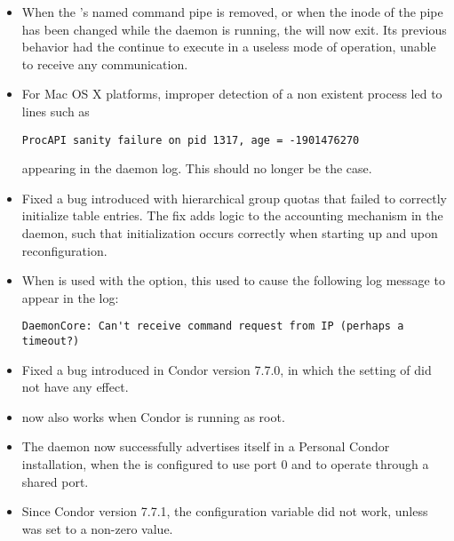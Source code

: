 \begin{itemize}

\item When the 's named command pipe is removed, 
or when the inode of the pipe has been changed while the daemon is running, 
the  will now exit.
Its previous behavior had the  continue to execute 
in a useless mode of operation, unable to receive any communication.

\item For Mac OS X platforms, 
improper detection of a non existent process led to lines such as
\begin{verbatim}
ProcAPI sanity failure on pid 1317, age = -1901476270
\end{verbatim}
appearing in the  daemon log.
This should no longer be the case.

\item Fixed a bug introduced with hierarchical group quotas that
failed to correctly initialize table entries.
The fix adds logic to the accounting mechanism in the
 daemon,
such that initialization occurs correctly 
when starting up and upon reconfiguration.

\item When  is used with the  option, this
used to cause the following log message to appear in the 
log:
\begin{verbatim}
DaemonCore: Can't receive command request from IP (perhaps a timeout?)
\end{verbatim}

\item Fixed a bug introduced in Condor version 7.7.0,
in which the setting of  did not have any effect.

\item {} now also works when Condor is running as root.

\item The  daemon now successfully advertises itself in 
a Personal Condor installation,
when the  is configured to use port 0
and to operate through a shared port.

\item Since Condor version 7.7.1, 
the configuration variable  did not work,
unless  was set to a non-zero value.


\end{itemize}
